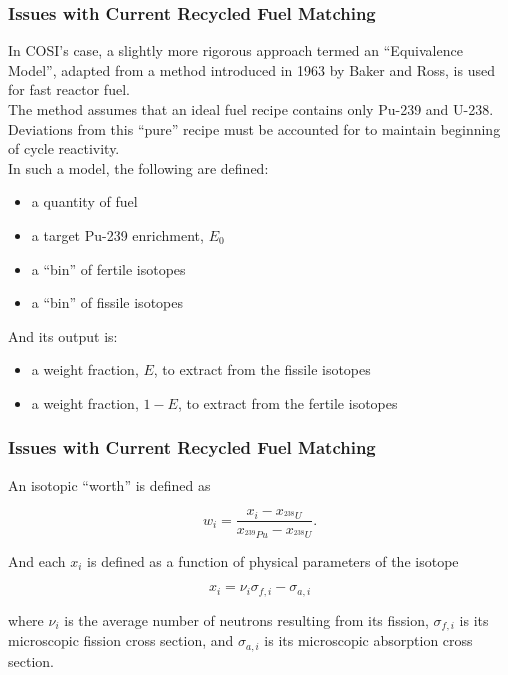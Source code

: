 \begin{frame}[ctb!]
  \frametitle{Issues with Current Recycled Fuel Matching}

  In COSI's case, a slightly more rigorous approach termed an ``Equivalence
  Model'', adapted from a method introduced in 1963 by Baker and
  Ross\cite{baker_comparison_1963}, is used for fast reactor fuel.\\

  The method assumes that an ideal fuel recipe contains only Pu-239 and
  U-238. Deviations from this ``pure'' recipe must be accounted for to maintain
  beginning of cycle reactivity.\\

  In such a model, the following are defined:
  \begin{itemize}
    \item a quantity of fuel
    \item a target Pu-239 enrichment, $E_0$
    \item a ``bin'' of fertile isotopes
    \item a ``bin'' of fissile isotopes
  \end{itemize}

  And its output is:
  \begin{itemize}
    \item a weight fraction, $E$, to extract from the fissile isotopes
    \item a weight fraction, $1-E$, to extract from the fertile isotopes
  \end{itemize}
\end{frame}

\begin{frame}[ctb!]
  \frametitle{Issues with Current Recycled Fuel Matching}
  An isotopic ``worth'' is defined as
  
  \begin{equation}
    w_i = \frac{x_i - x_{^{238}U}}
    {x_{^{239}Pu} - x_{^{238}U}}.
  \end{equation}

  And each $x_i$ is defined as a function of physical parameters of the isotope
  
  \begin{equation}
    x_i = \nu_{i} \sigma_{f,i} - \sigma_{a,i}
  \end{equation}

  where $\nu_{i}$ is the average number of neutrons resulting from its fission,
  $\sigma_{f,i}$ is its microscopic fission cross section, and $\sigma_{a,i}$ is
  its microscopic absorption cross section.
\end{frame}


